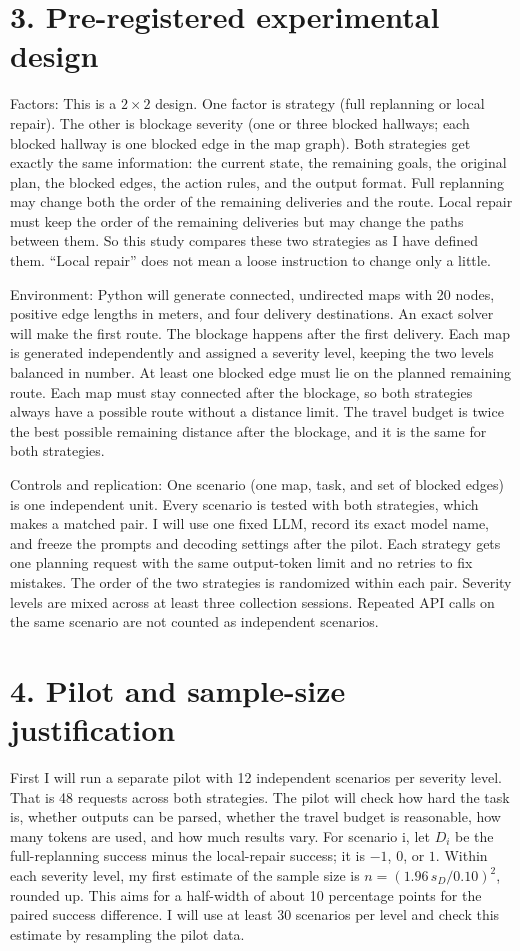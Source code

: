 \documentclass[10.5pt]{article}
\begin{document}
\section*{3. Pre-registered experimental design}
Factors: This is a $2\times 2$ design. One factor is strategy (full replanning or local repair). The other is blockage severity (one or three blocked hallways; each blocked hallway is one blocked edge in the map graph). Both strategies get exactly the same information: the current state, the remaining goals, the original plan, the blocked edges, the action rules, and the output format. Full replanning may change both the order of the remaining deliveries and the route. Local repair must keep the order of the remaining deliveries but may change the paths between them. So this study compares these two strategies as I have defined them. ``Local repair'' does not mean a loose instruction to change only a little.

Environment: Python will generate connected, undirected maps with 20 nodes, positive edge lengths in meters, and four delivery destinations. An exact solver will make the first route. The blockage happens after the first delivery. Each map is generated independently and assigned a severity level, keeping the two levels balanced in number. At least one blocked edge must lie on the planned remaining route. Each map must stay connected after the blockage, so both strategies always have a possible route without a distance limit. The travel budget is twice the best possible remaining distance after the blockage, and it is the same for both strategies.

Controls and replication: One scenario (one map, task, and set of blocked edges) is one independent unit. Every scenario is tested with both strategies, which makes a matched pair. I will use one fixed LLM, record its exact model name, and freeze the prompts and decoding settings after the pilot. Each strategy gets one planning request with the same output-token limit and no retries to fix mistakes. The order of the two strategies is randomized within each pair. Severity levels are mixed across at least three collection sessions. Repeated API calls on the same scenario are not counted as independent scenarios.

\section*{4. Pilot and sample-size justification}
First I will run a separate pilot with 12 independent scenarios per severity level. That is 48 requests across both strategies. The pilot will check how hard the task is, whether outputs can be parsed, whether the travel budget is reasonable, how many tokens are used, and how much results vary. For scenario i, let $D_i$ be the full-replanning success minus the local-repair success; it is $-1$, $0$, or $1$. Within each severity level, my first estimate of the sample size is $n = (1.96\,s_D / 0.10)^2$, rounded up. This aims for a half-width of about 10 percentage points for the paired success difference. I will use at least 30 scenarios per level and check this estimate by resampling the pilot data.
\end{document}
